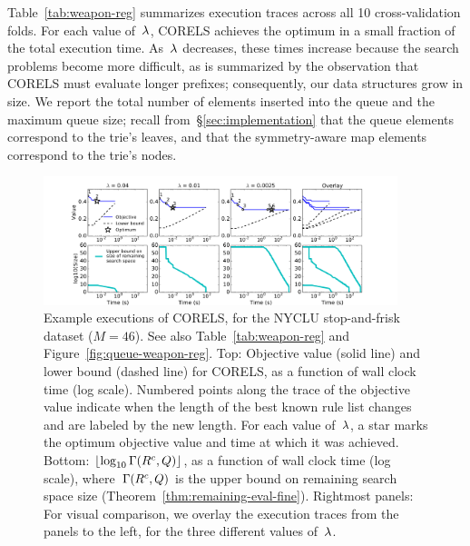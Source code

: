 Table~\ref{tab:weapon-reg} summarizes execution traces across all 10 cross-validation folds.
%
For each value of~${\lambda}$, CORELS achieves the optimum in a small fraction of the total execution time.
%
As~${\lambda}$ decreases, these times increase because the search problems become more difficult,
as is summarized by the observation that CORELS must evaluate longer prefixes;
consequently, our data structures grow in size.
%
We report the total number of elements inserted into the queue and the maximum queue size;
recall from~\S\ref{sec:implementation} that the queue elements correspond to the trie's leaves,
and that the symmetry-aware map elements correspond to the trie's nodes.

\begin{figure}[t!]
\begin{center}
\includegraphics[trim={35mm 0mm 35mm 15mm},
width=0.92\textwidth]{figs/weapon_reg-execution.pdf}
\end{center}
\vspace{-5mm}
\caption{Example executions of CORELS, for the NYCLU stop-and-frisk dataset (${M = 46}$).
%
See also Table~\ref{tab:weapon-reg} and Figure~\ref{fig:queue-weapon-reg}.
%
Top: Objective value (solid line) and lower bound (dashed line) for CORELS,
as a function of wall clock time (log scale).
%
Numbered points along the trace of the objective value
indicate when the length of the best known rule list changes
and are labeled by the new length.
%
For each value of~${\lambda}$, a star marks the optimum objective value
and time at which it was achieved.
%
Bottom: $\lfloor \log_{10} \Gamma({R^c}, Q) \rfloor$,
as a function of wall clock time (log scale),
where~$\Gamma({R^c}, Q)$
is the upper bound on remaining search space size
(Theorem~\ref{thm:remaining-eval-fine}).
%
Rightmost panels: For visual comparison, we overlay the execution traces
from the panels to the left, for the three different values of~${\lambda}$.
}
\label{fig:weapon-reg-execution}
\end{figure}
%

